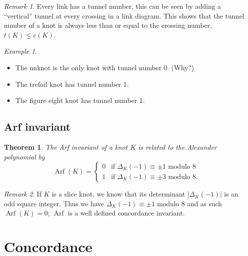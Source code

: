\documentclass[nobib]{tufte-book} %
\newtheorem{theorem}{Theorem}
\theoremstyle{definition}
\theoremstyle{remark}
\newtheorem{remark}{Remark}
\newtheorem{example}{Example}
\DeclareMathOperator{\Arf}{Arf}
\begin{document}
\begin{remark}
	Every link has a tunnel number, this can be seen by adding a ``vertical''
	tunnel at every crossing in a link diagram.
	This shows that the tunnel number of a knot is always less than or equal
	to the crossing number, $t(K) \le c(K)$.
\end{remark}

\begin{example}
	\begin{itemize}
		\item The unknot is the only knot with tunnel number 0. (Why?)
		\item The trefoil knot has tunnel number 1.
		\item The figure eight knot has tunnel number 1.
	\end{itemize}
\end{example}



\subsection{Arf invariant}

\begin{theorem}
	The Arf invariant of a knot $K$ is related to the Alexander polynomial by
	\begin{equation*}
		\Arf(K) =
		\begin{cases}
			0 & \textrm{if } \Delta_{K}(-1) \equiv \pm 1 \textrm{ modulo } 8 \\
			1 & \textrm{if } \Delta_{K}(-1) \equiv \pm 3 \textrm{ modulo } 8.
		\end{cases}
	\end{equation*}
\end{theorem}

\begin{remark}
	If $K$ is a slice knot, we know that its determinant
	$| \Delta_{K}(-1) |$ is an odd square integer.
	Thus we have $\Delta_{K}(-1) \equiv \pm 1 \textrm{ modulo } 8$
	and as such $\Arf(K) = 0$; $\Arf$ is a well defined concordance invariant.
\end{remark}


\section{Concordance}
\end{document}
